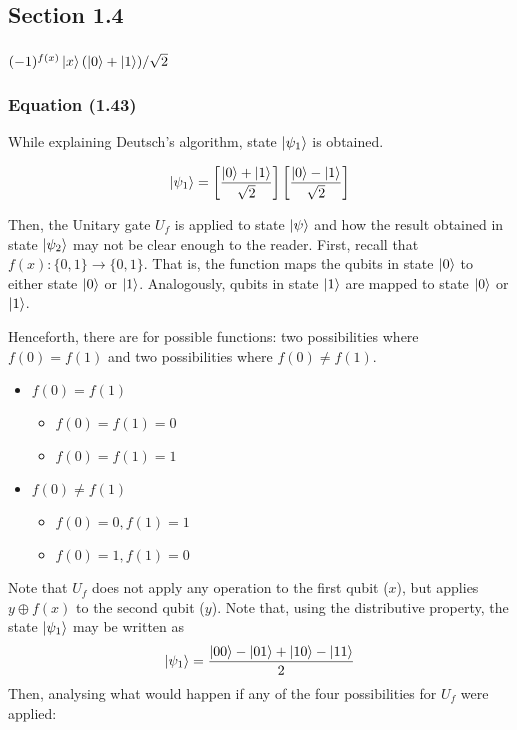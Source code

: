 \subsection{Section 1.4}
\subsubsection{$(-1)^{f(x)}\ket{x}(\ket{0} + \ket{1})/\sqrt{2}$}

\subsubsection{Equation (1.43)}

While explaining Deutsch's algorithm, state \( \ket{\psi_1} \) is obtained.

\[
\ket{\psi_1} = \left[ \frac{\ket{0} + \ket{1}}{\sqrt{2}} \right]
    \left[ \frac{\ket{0} - \ket{1}}{\sqrt{2}} \right]
\]

Then, the Unitary gate \(U_f\) is applied to state \(\ket{\psi}\) and how the result obtained in state \(\ket{\psi_2}\) may not be clear enough to the reader. First, recall that \(f(x) : \{0, 1\} \to \{0, 1\}\). That is, the function maps the qubits in state \(\ket{0}\) to either state \(\ket{0}\) or \(\ket{1}\). Analogously, qubits in state \(\ket{1}\) are mapped to state \(\ket{0}\) or \(\ket{1}\).

Henceforth, there are for possible functions: two possibilities where \(f(0) = f(1)\) and two possibilities where \(f(0) \neq f(1)\).

\begin{itemize}
    \item \(f(0) = f(1)\)
    \begin{itemize}
        \item \(f(0) = f(1) = 0\)
        \item \(f(0) = f(1) = 1\)
    \end{itemize}
    
    \item \(f(0) \neq f(1)\)
    \begin{itemize}
        \item \(f(0) = 0, f(1) = 1\)
        \item \(f(0) = 1, f(1) = 0\)
    \end{itemize}
\end{itemize}

Note that \(U_f\) does not apply any operation to the first qubit (\(x\)), but applies \(y \oplus f(x)\) to the second qubit (\(y\)). Note that, using the distributive property, the state \(\ket{\psi_1}\) may be written as
\[\ket{\psi_1} = \frac{\ket{00} - \ket{01} + \ket{10} - \ket{11}}{2}\]
Then, analysing what would happen if any of the four possibilities for \(U_f\) were applied:

